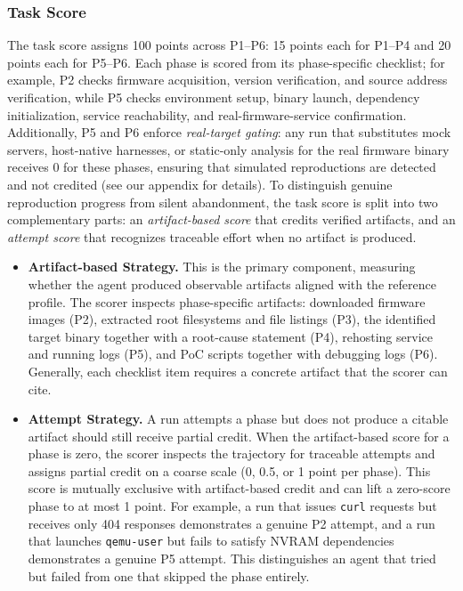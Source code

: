 \subsubsection{Task Score}
The task score assigns 100 points across P1--P6: 15 points each for P1--P4 and 20 points each for P5--P6. Each phase is scored from its phase-specific checklist; for example, P2 checks firmware acquisition, version verification, and source address verification, while P5 checks environment setup, binary launch, dependency initialization, service reachability, and real-firmware-service confirmation. Additionally, P5 and P6 enforce \emph{real-target gating}: any run that substitutes mock servers, host-native harnesses, or static-only analysis for the real firmware binary receives 0 for these phases, ensuring that simulated reproductions are detected and not credited (see our appendix for details). To distinguish genuine reproduction progress from silent abandonment, the task score is split into two complementary parts: an \emph{artifact-based score} that credits verified artifacts, and an \emph{attempt score} that recognizes traceable effort when no artifact is produced.

\begin{itemize}

\item \noindent\textbf{Artifact-based Strategy.} This is the primary component, measuring whether the agent produced observable artifacts aligned with the reference profile. The scorer inspects phase-specific artifacts: downloaded firmware images (P2), extracted root filesystems and file listings (P3), the identified target binary together with a root-cause statement (P4), rehosting service and running logs (P5), and PoC scripts together with debugging logs (P6). Generally, each checklist item requires a concrete artifact that the scorer can cite.

\item \noindent\textbf{Attempt Strategy.} 
A run attempts a phase but does not produce a citable artifact should still receive partial credit. When the artifact-based score for a phase is zero, the scorer inspects the trajectory for traceable attempts and assigns partial credit on a coarse scale (0, 0.5, or 1 point per phase). This score is mutually exclusive with artifact-based credit and can lift a zero-score phase to at most 1 point. For example, a run that issues \texttt{curl} requests 
but receives only 404 responses demonstrates a genuine P2 attempt, and a run that launches \texttt{qemu-user} but fails to satisfy NVRAM dependencies demonstrates a genuine P5 attempt. This distinguishes an agent that tried but failed from one that skipped the phase entirely. 

\end{itemize}

